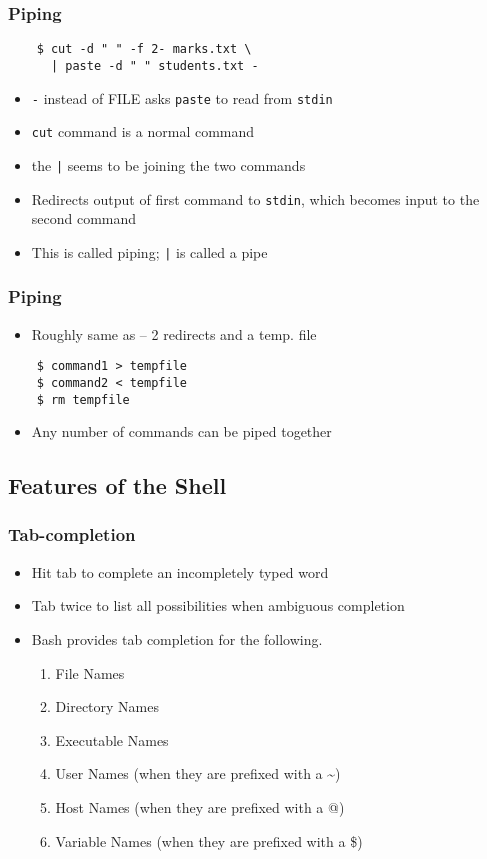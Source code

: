 \documentclass[12pt,compress]{beamer}
\begin{document}
\begin{frame}[fragile]
  \frametitle{Piping}
  \begin{lstlisting}
    $ cut -d " " -f 2- marks.txt \
      | paste -d " " students.txt -
  \end{lstlisting} %
  \begin{itemize}
  \item \texttt{-} instead of FILE asks \texttt{paste} to read from
    \texttt{stdin}
  \item \texttt{cut} command is a normal command
  \item the \texttt{|} seems to be joining the two commands
  \item Redirects output of first command to \texttt{stdin}, which
    becomes input to the second command
  \item This is called piping; \texttt{|} is called a pipe
  \end{itemize}
\end{frame}

\begin{frame}[fragile]
  \frametitle{Piping}
  \begin{itemize}
  \item Roughly same as -- 2 redirects and a temp. file
  \end{itemize}
  \begin{lstlisting}
    $ command1 > tempfile
    $ command2 < tempfile
    $ rm tempfile
  \end{lstlisting} %
  \begin{itemize}
  \item Any number of commands can be piped together
  \end{itemize}
\end{frame}

\subsection{Features of the Shell}

\begin{frame}[fragile]
  \frametitle{Tab-completion}
  \begin{itemize}
  \item Hit tab to complete an incompletely typed word
  \item Tab twice to list all possibilities when ambiguous completion
  \item Bash provides tab completion for the following.
    \begin{enumerate}
    \item File Names
    \item Directory Names
    \item Executable Names
    \item User Names (when they are prefixed with a \~{})
    \item Host Names (when they are prefixed with a @)
    \item Variable Names (when they are prefixed with a \$)
    \end{enumerate}
  \end{itemize}
\end{frame}
\end{document}
